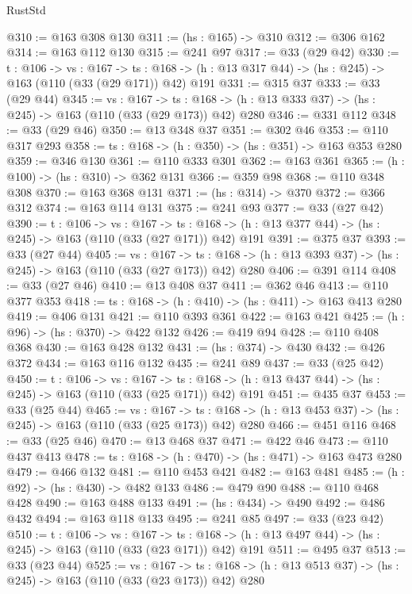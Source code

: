 \begin{lexlean}{RustStd}
\begin{coremodule}
{\begin{coremodule}
{{{@310 := @163 @308 @130
@311 := (hs : @165) -> @310
@312 := @306 @162
@314 := @163 @112 @130
@315 := @241 @97
@317 := @33 (@29 @42)
@330 := {t : @106} ->
  {vs : @167} ->
  {ts : @168} -> (h : @13 @317 @44) -> (hs : @245) -> @163 (@110 (@33 (@29 @171)) @42) @191
@331 := @315 @37
@333 := @33 (@29 @44)
@345 := {vs : @167} ->
  {ts : @168} -> (h : @13 @333 @37) -> (hs : @245) -> @163 (@110 (@33 (@29 @173)) @42) @280
@346 := @331 @112
@348 := @33 (@29 @46)
@350 := @13 @348 @37
@351 := @302 @46
@353 := @110 @317 @293
@358 := {ts : @168} -> (h : @350) -> (hs : @351) -> @163 @353 @280
@359 := @346 @130
@361 := @110 @333 @301
@362 := @163 @361
@365 := (h : @100) -> (hs : @310) -> @362 @131
@366 := @359 @98
@368 := @110 @348 @308
@370 := @163 @368 @131
@371 := (hs : @314) -> @370
@372 := @366 @312
@374 := @163 @114 @131
@375 := @241 @93
@377 := @33 (@27 @42)
@390 := {t : @106} ->
  {vs : @167} ->
  {ts : @168} -> (h : @13 @377 @44) -> (hs : @245) -> @163 (@110 (@33 (@27 @171)) @42) @191
@391 := @375 @37
@393 := @33 (@27 @44)
@405 := {vs : @167} ->
  {ts : @168} -> (h : @13 @393 @37) -> (hs : @245) -> @163 (@110 (@33 (@27 @173)) @42) @280
@406 := @391 @114
@408 := @33 (@27 @46)
@410 := @13 @408 @37
@411 := @362 @46
@413 := @110 @377 @353
@418 := {ts : @168} -> (h : @410) -> (hs : @411) -> @163 @413 @280
@419 := @406 @131
@421 := @110 @393 @361
@422 := @163 @421
@425 := (h : @96) -> (hs : @370) -> @422 @132
@426 := @419 @94
@428 := @110 @408 @368
@430 := @163 @428 @132
@431 := (hs : @374) -> @430
@432 := @426 @372
@434 := @163 @116 @132
@435 := @241 @89
@437 := @33 (@25 @42)
@450 := {t : @106} ->
  {vs : @167} ->
  {ts : @168} -> (h : @13 @437 @44) -> (hs : @245) -> @163 (@110 (@33 (@25 @171)) @42) @191
@451 := @435 @37
@453 := @33 (@25 @44)
@465 := {vs : @167} ->
  {ts : @168} -> (h : @13 @453 @37) -> (hs : @245) -> @163 (@110 (@33 (@25 @173)) @42) @280
@466 := @451 @116
@468 := @33 (@25 @46)
@470 := @13 @468 @37
@471 := @422 @46
@473 := @110 @437 @413
@478 := {ts : @168} -> (h : @470) -> (hs : @471) -> @163 @473 @280
@479 := @466 @132
@481 := @110 @453 @421
@482 := @163 @481
@485 := (h : @92) -> (hs : @430) -> @482 @133
@486 := @479 @90
@488 := @110 @468 @428
@490 := @163 @488 @133
@491 := (hs : @434) -> @490
@492 := @486 @432
@494 := @163 @118 @133
@495 := @241 @85
@497 := @33 (@23 @42)
@510 := {t : @106} ->
  {vs : @167} ->
  {ts : @168} -> (h : @13 @497 @44) -> (hs : @245) -> @163 (@110 (@33 (@23 @171)) @42) @191
@511 := @495 @37
@513 := @33 (@23 @44)
@525 := {vs : @167} ->
  {ts : @168} -> (h : @13 @513 @37) -> (hs : @245) -> @163 (@110 (@33 (@23 @173)) @42) @280
}}}
\end{coremodule}}
\end{coremodule}
\end{lexlean}
